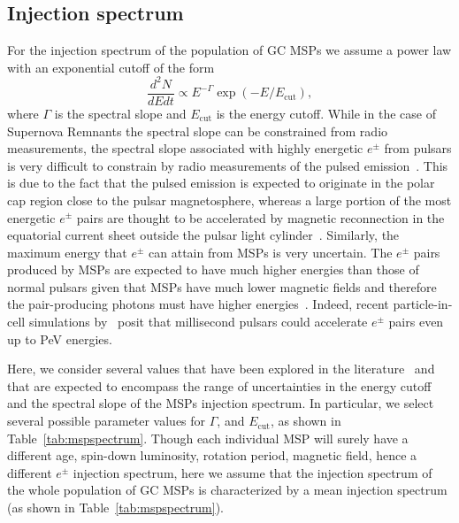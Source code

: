 \documentclass[doublespace,nopageskip]{VTthesis} %
\begin{document}
\subsection{Injection spectrum}\label{subsec:spectrum}

For the injection spectrum of the population of GC MSPs we 
assume a power law with an exponential cutoff of the form 
\begin{equation}
  \label{eq:mspspectrum}
  \dfrac{d^2N}{dEdt} \propto E^{-\Gamma}\exp(-E/E_{\text{cut}}),
\end{equation}
where $\Gamma$ is the spectral slope and $E_{\text{cut}}$ is the energy cutoff. While in the case of Supernova Remnants the spectral slope can be constrained from radio measurements, the spectral slope associated with highly energetic $e^\pm$ from pulsars is very difficult to constrain by radio measurements of the pulsed emission~\citep{Delahaye:2010}. This is due to the fact that the pulsed emission is expected to originate in the polar cap region close to the pulsar magnetosphere, whereas a large portion of the most energetic $e^\pm$ pairs are thought to be accelerated by magnetic reconnection in the equatorial current sheet outside the pulsar light cylinder~\citep{Cerutti:2015hvk}. Similarly, the maximum energy that $e^{\pm}$ can attain from MSPs is very uncertain. The $e^\pm$ pairs produced by MSPs are expected to have much higher energies than those of normal pulsars given that MSPs have much lower magnetic fields and therefore the pair-producing photons must have higher energies~\citep{Harding:2021yuv}. Indeed, recent particle-in-cell simulations by~\citep{Guepin:2019fjb} posit that millisecond pulsars could accelerate $e^\pm$ pairs even up to PeV energies.

 Here, we consider several values that have been explored in the literature~\citep[e.g.,][]{Yuan:2014yda,Song:2019nrx,Guepin:2019fjb} and that are expected to encompass the range of uncertainties in the energy cutoff and the spectral slope of the MSPs injection spectrum. In particular, we select several possible parameter values for $\Gamma$, and $E_{\text{cut}}$, as shown in Table~\ref{tab:mspspectrum}. 
 Though each individual MSP will surely have a different age, spin-down luminosity, rotation period, magnetic field, hence a different $e^\pm$ injection spectrum, here we assume that the injection spectrum of the whole population of GC MSPs is characterized by a mean injection spectrum (as shown in Table~\ref{tab:mspspectrum}).
 
\end{document}
